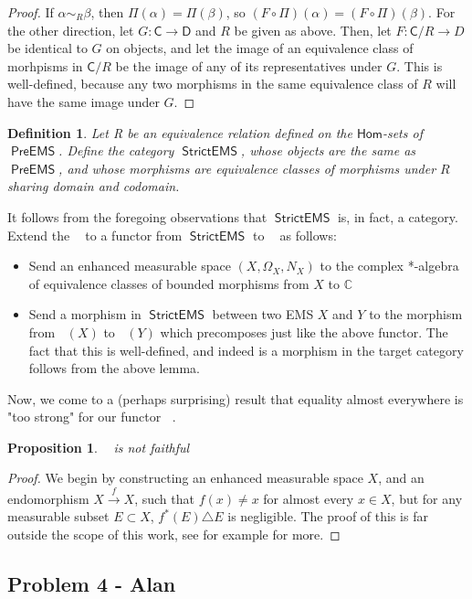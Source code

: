 \documentclass{article}
\newcommand{\C}{\mathbb{C}}
\newtheorem{proposition}[subsection]{Proposition}
\newtheorem{definition}[subsection]{Definition}
\DeclareMathOperator{\calg}{\textsf{CAlg}^{*}_{\mathbb{C}}}
\DeclareMathOperator{\linf}{L^\infty}
\DeclareMathOperator{\preems}{\textsf{PreEMS}}
\DeclareMathOperator{\strictems}{\textsf{StrictEMS}}
\begin{document}
\begin{proof}
	If $\alpha\sim_R\beta$, then $\Pi(\alpha)=\Pi(\beta)$, so $(F\circ\Pi)(\alpha) = (F\circ\Pi)(\beta)$.  For the other direction, let $G:\textsf{C}\rightarrow{\textsf{D}}$ and $R$ be given as above.  Then, let $F: \textsf{C}/R\rightarrow{D}$ be identical to $G$ on objects, and let the image of an equivalence class of morhpisms in $\textsf{C}/R$ be the image of any of its representatives under $G$.  This is well-defined, because any two morphisms in the same equivalence class of $R$ will have the same image under $G$.
\end{proof}
\begin{definition}
	Let R be an equivalence relation defined on the $\textsf{Hom}$-sets of $\preems$.  Define the category $\strictems$, whose objects are the same as $\preems$, and whose morphisms are equivalence classes of morphisms under $R$ sharing domain and codomain.
\end{definition}
It follows from the foregoing observations that $\strictems$ is, in fact, a category.  Extend the $\linf$ to a functor from $\strictems$ to $\calg$ as follows:
\begin{itemize}
	\item Send an enhanced measurable space $(X,\Omega_X,N_X)$ to the complex *-algebra of equivalence classes of bounded morphisms from $X$ to $\C$
	\item Send a morphism in $\strictems$ between two EMS $X$ and $Y$ to the morphism from $\linf(X)$ to $\linf(Y)$ which precomposes just like the above functor.  The fact that this is well-defined, and indeed is a morphism in the target category follows from the above lemma.
\end{itemize}
Now, we come to a (perhaps surprising) result that equality almost everywhere is "too strong" for our functor $\linf$.
\begin{proposition}
	$\linf$ is not faithful
\end{proposition}
\begin{proof}
	We begin by constructing an enhanced measurable space $X$, and an endomorphism $X\xrightarrow{f}X$, such that $f(x)\neq x$ for almost every $x\in X$, but for any measurable subset $E\subset X$, $f^*(E)\triangle E$ is negligible.  The proof of this is far outside the scope of this work, see for example \cite{fremlin_2011} for more.
\end{proof}
\subsection{Problem 4 - Alan}
\end{document}
